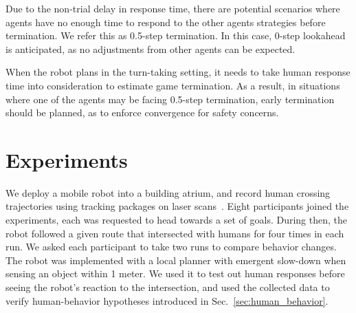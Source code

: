 \documentclass[letterpaper, 10 pt, conference]{ieeeconf}  %
\begin{document}
Due to the non-trial delay in response time, there are potential scenarios 
where agents have no enough time to respond to the other agents strategies 
before termination. We refer this as 0.5-step  
termination. In this case, 0-step lookahead is anticipated, as no 
adjustments from other agents can be expected.

When the robot plans in the turn-taking setting, it needs to take human 
response time into consideration to estimate game termination. As a result, in 
situations where one of the agents may be facing 0.5-step termination, early 
termination should be planned, as to enforce convergence for safety concerns.

\section{Experiments}
We deploy a mobile robot into a building atrium, and record human crossing 
trajectories using tracking packages on laser scans~\cite{leigh2015person}. 
Eight participants joined the experiments, each was requested to head towards 
a set of goals. During then, the robot followed a given route 
that intersected with humans for four times in each run. We asked each participant 
to take two runs to compare behavior changes. The robot was implemented with a 
local planner with emergent slow-down when sensing an object within 1 meter. 
We used it to test out human responses before seeing the robot's reaction to 
the intersection, and used the collected data to verify human-behavior 
hypotheses introduced in Sec.~\ref{sec:human_behavior}. 
\end{document}
